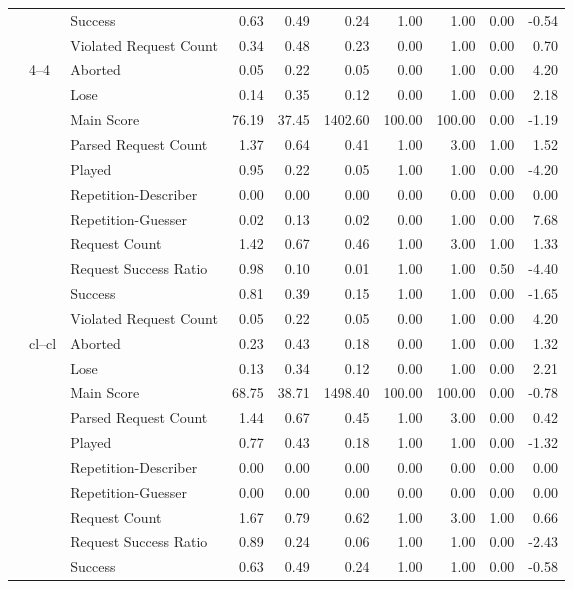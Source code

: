 \begin{tabular}{lllrrrrrrr}
 &  & Success & 0.63 & 0.49 & 0.24 & 1.00 & 1.00 & 0.00 & -0.54 \\
 &  & Violated Request Count & 0.34 & 0.48 & 0.23 & 0.00 & 1.00 & 0.00 & 0.70 \\
\cline{2-10}
 & \multirow[t]{11}{*}{4--4} & Aborted & 0.05 & 0.22 & 0.05 & 0.00 & 1.00 & 0.00 & 4.20 \\
 &  & Lose & 0.14 & 0.35 & 0.12 & 0.00 & 1.00 & 0.00 & 2.18 \\
 &  & Main Score & 76.19 & 37.45 & 1402.60 & 100.00 & 100.00 & 0.00 & -1.19 \\
 &  & Parsed Request Count & 1.37 & 0.64 & 0.41 & 1.00 & 3.00 & 1.00 & 1.52 \\
 &  & Played & 0.95 & 0.22 & 0.05 & 1.00 & 1.00 & 0.00 & -4.20 \\
 &  & Repetition-Describer & 0.00 & 0.00 & 0.00 & 0.00 & 0.00 & 0.00 & 0.00 \\
 &  & Repetition-Guesser & 0.02 & 0.13 & 0.02 & 0.00 & 1.00 & 0.00 & 7.68 \\
 &  & Request Count & 1.42 & 0.67 & 0.46 & 1.00 & 3.00 & 1.00 & 1.33 \\
 &  & Request Success Ratio & 0.98 & 0.10 & 0.01 & 1.00 & 1.00 & 0.50 & -4.40 \\
 &  & Success & 0.81 & 0.39 & 0.15 & 1.00 & 1.00 & 0.00 & -1.65 \\
 &  & Violated Request Count & 0.05 & 0.22 & 0.05 & 0.00 & 1.00 & 0.00 & 4.20 \\
\cline{2-10}
 & \multirow[t]{11}{*}{cl--cl} & Aborted & 0.23 & 0.43 & 0.18 & 0.00 & 1.00 & 0.00 & 1.32 \\
 &  & Lose & 0.13 & 0.34 & 0.12 & 0.00 & 1.00 & 0.00 & 2.21 \\
 &  & Main Score & 68.75 & 38.71 & 1498.40 & 100.00 & 100.00 & 0.00 & -0.78 \\
 &  & Parsed Request Count & 1.44 & 0.67 & 0.45 & 1.00 & 3.00 & 0.00 & 0.42 \\
 &  & Played & 0.77 & 0.43 & 0.18 & 1.00 & 1.00 & 0.00 & -1.32 \\
 &  & Repetition-Describer & 0.00 & 0.00 & 0.00 & 0.00 & 0.00 & 0.00 & 0.00 \\
 &  & Repetition-Guesser & 0.00 & 0.00 & 0.00 & 0.00 & 0.00 & 0.00 & 0.00 \\
 &  & Request Count & 1.67 & 0.79 & 0.62 & 1.00 & 3.00 & 1.00 & 0.66 \\
 &  & Request Success Ratio & 0.89 & 0.24 & 0.06 & 1.00 & 1.00 & 0.00 & -2.43 \\
 &  & Success & 0.63 & 0.49 & 0.24 & 1.00 & 1.00 & 0.00 & -0.58 \\

\end{tabular}
